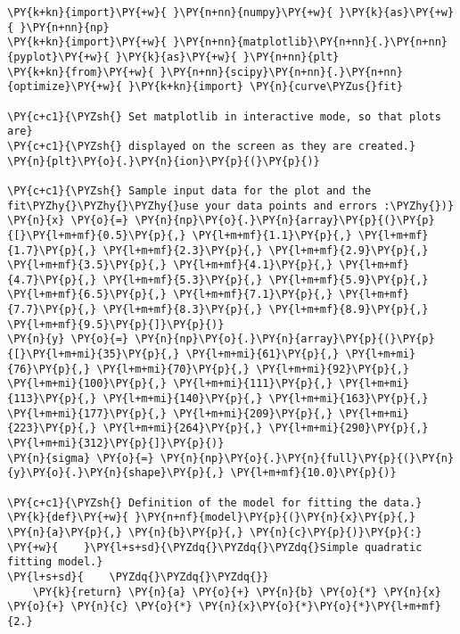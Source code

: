 \begin{Verbatim}[label=\makebox{\href{https://github.com/unipi-physics-labs/statnotes/tree/main/snippy/residual_plot.py}{https://github.com/.../residual\_plot.py}},commandchars=\\\{\}]
\PY{k+kn}{import}\PY{+w}{ }\PY{n+nn}{numpy}\PY{+w}{ }\PY{k}{as}\PY{+w}{ }\PY{n+nn}{np}
\PY{k+kn}{import}\PY{+w}{ }\PY{n+nn}{matplotlib}\PY{n+nn}{.}\PY{n+nn}{pyplot}\PY{+w}{ }\PY{k}{as}\PY{+w}{ }\PY{n+nn}{plt}
\PY{k+kn}{from}\PY{+w}{ }\PY{n+nn}{scipy}\PY{n+nn}{.}\PY{n+nn}{optimize}\PY{+w}{ }\PY{k+kn}{import} \PY{n}{curve\PYZus{}fit}

\PY{c+c1}{\PYZsh{} Set matplotlib in interactive mode, so that plots are}
\PY{c+c1}{\PYZsh{} displayed on the screen as they are created.}
\PY{n}{plt}\PY{o}{.}\PY{n}{ion}\PY{p}{(}\PY{p}{)}

\PY{c+c1}{\PYZsh{} Sample input data for the plot and the fit\PYZhy{}\PYZhy{}\PYZhy{}use your data points and errors :\PYZhy{})}
\PY{n}{x} \PY{o}{=} \PY{n}{np}\PY{o}{.}\PY{n}{array}\PY{p}{(}\PY{p}{[}\PY{l+m+mf}{0.5}\PY{p}{,} \PY{l+m+mf}{1.1}\PY{p}{,} \PY{l+m+mf}{1.7}\PY{p}{,} \PY{l+m+mf}{2.3}\PY{p}{,} \PY{l+m+mf}{2.9}\PY{p}{,} \PY{l+m+mf}{3.5}\PY{p}{,} \PY{l+m+mf}{4.1}\PY{p}{,} \PY{l+m+mf}{4.7}\PY{p}{,} \PY{l+m+mf}{5.3}\PY{p}{,} \PY{l+m+mf}{5.9}\PY{p}{,} \PY{l+m+mf}{6.5}\PY{p}{,} \PY{l+m+mf}{7.1}\PY{p}{,} \PY{l+m+mf}{7.7}\PY{p}{,} \PY{l+m+mf}{8.3}\PY{p}{,} \PY{l+m+mf}{8.9}\PY{p}{,} \PY{l+m+mf}{9.5}\PY{p}{]}\PY{p}{)}
\PY{n}{y} \PY{o}{=} \PY{n}{np}\PY{o}{.}\PY{n}{array}\PY{p}{(}\PY{p}{[}\PY{l+m+mi}{35}\PY{p}{,} \PY{l+m+mi}{61}\PY{p}{,} \PY{l+m+mi}{76}\PY{p}{,} \PY{l+m+mi}{70}\PY{p}{,} \PY{l+m+mi}{92}\PY{p}{,} \PY{l+m+mi}{100}\PY{p}{,} \PY{l+m+mi}{111}\PY{p}{,} \PY{l+m+mi}{113}\PY{p}{,} \PY{l+m+mi}{140}\PY{p}{,} \PY{l+m+mi}{163}\PY{p}{,} \PY{l+m+mi}{177}\PY{p}{,} \PY{l+m+mi}{209}\PY{p}{,} \PY{l+m+mi}{223}\PY{p}{,} \PY{l+m+mi}{264}\PY{p}{,} \PY{l+m+mi}{290}\PY{p}{,} \PY{l+m+mi}{312}\PY{p}{]}\PY{p}{)}
\PY{n}{sigma} \PY{o}{=} \PY{n}{np}\PY{o}{.}\PY{n}{full}\PY{p}{(}\PY{n}{y}\PY{o}{.}\PY{n}{shape}\PY{p}{,} \PY{l+m+mf}{10.0}\PY{p}{)}

\PY{c+c1}{\PYZsh{} Definition of the model for fitting the data.}
\PY{k}{def}\PY{+w}{ }\PY{n+nf}{model}\PY{p}{(}\PY{n}{x}\PY{p}{,} \PY{n}{a}\PY{p}{,} \PY{n}{b}\PY{p}{,} \PY{n}{c}\PY{p}{)}\PY{p}{:}
\PY{+w}{    }\PY{l+s+sd}{\PYZdq{}\PYZdq{}\PYZdq{}Simple quadratic fitting model.}
\PY{l+s+sd}{    \PYZdq{}\PYZdq{}\PYZdq{}}
    \PY{k}{return} \PY{n}{a} \PY{o}{+} \PY{n}{b} \PY{o}{*} \PY{n}{x} \PY{o}{+} \PY{n}{c} \PY{o}{*} \PY{n}{x}\PY{o}{*}\PY{o}{*}\PY{l+m+mf}{2.}


\end{Verbatim}
